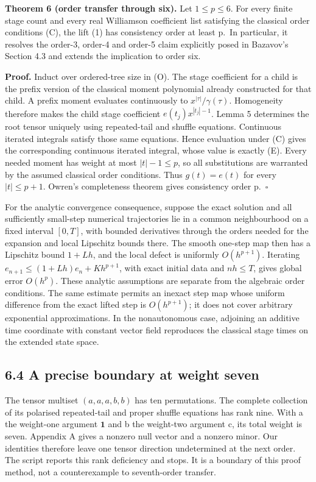\documentclass[
  11pt,
  a4paper,
]{scrartcl}
\begin{document}
\textbf{Theorem 6 (order transfer through six).} Let \(1\leq p\leq6\).
For every finite stage count and every real Williamson coefficient list
satisfying the classical order conditions (C), the lift (1) has
consistency order at least p.~In particular, it resolves the order-3,
order-4 and order-5 claim explicitly posed in Bazavov's Section 4.3 and
extends the implication to order six.

\textbf{Proof.} Induct over ordered-tree size in (O). The stage
coefficient for a child is the prefix version of the classical moment
polynomial already constructed for that child. A prefix moment evaluates
continuously to \(x^{|\tau|}/\gamma(\tau)\). Homogeneity therefore makes
the child stage coefficient \(e(t_j)x^{|t_j|-1}\). Lemma 5 determines
the root tensor uniquely using repeated-tail and shuffle equations.
Continuous iterated integrals satisfy those same equations. Hence
evaluation under (C) gives the corresponding continuous iterated
integral, whose value is exactly (E). Every needed moment has weight at
most \(|t|-1\leq p\), so all substitutions are warranted by the assumed
classical order conditions. Thus \(g(t)=e(t)\) for every
\(|t|\leq p+1\). Owren's completeness theorem gives consistency order
p.~\(\square\)

For the analytic convergence consequence, suppose the exact solution and
all sufficiently small-step numerical trajectories lie in a common
neighbourhood on a fixed interval \([0,T]\), with bounded derivatives
through the orders needed for the expansion and local Lipschitz bounds
there. The smooth one-step map then has a Lipschitz bound \(1+Lh\), and
the local defect is uniformly \(O(h^{p+1})\). Iterating
\(e_{n+1}\leq(1+Lh)e_n+Kh^{p+1}\), with exact initial data and
\(nh\leq T\), gives global error \(O(h^p)\). These analytic assumptions
are separate from the algebraic order conditions. The same estimate
permits an inexact step map whose uniform difference from the exact
lifted step is \(O(h^{p+1})\); it does not cover arbitrary exponential
approximations. In the nonautonomous case, adjoining an additive time
coordinate with constant vector field reproduces the classical stage
times on the extended state space.

\subsection{6.4 A precise boundary at weight
seven}\label{a-precise-boundary-at-weight-seven}

The tensor multiset \((a,a,a,b,b)\) has ten permutations. The complete
collection of its polarised repeated-tail and proper shuffle equations
has rank nine. With a the weight-one argument \(\mathbf1\) and b the
weight-two argument c, its total weight is seven. Appendix A gives a
nonzero null vector and a nonzero minor. Our identities therefore leave
one tensor direction undetermined at the next order. The script reports
this rank deficiency and stops. It is a boundary of this proof method,
not a counterexample to seventh-order transfer.
\end{document}
